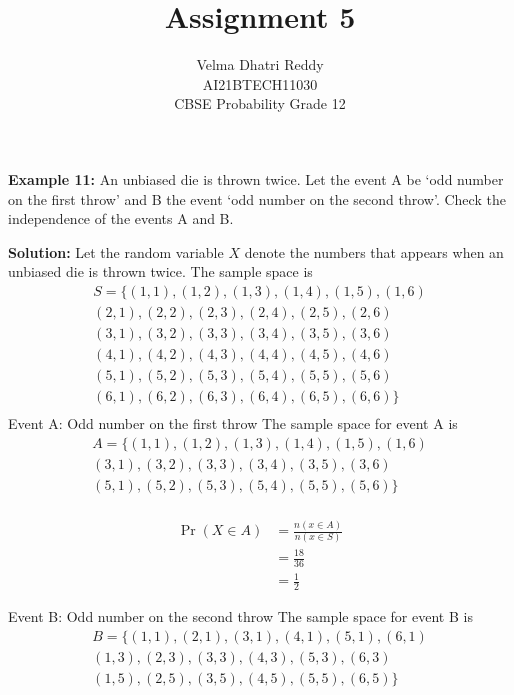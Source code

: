 \documentclass[journal,11pt,twocolumn]{IEEEtran}
\title{Assignment 5}
\author{Velma Dhatri Reddy \\ \normalsize AI21BTECH11030 \\ \vspace*{10pt} \Large CBSE Probability Grade 12}
\providecommand{\pr}[1]{\ensuremath{\Pr\left(#1\right)}}
\providecommand{\brak}[1]{\ensuremath{\left(#1\right)}}
\begin{document}
\maketitle
\textbf{Example 11:}
An unbiased die is thrown twice. Let the event A be ‘odd number on the first throw’ and B the event ‘odd number on the second throw’. Check the independence of the events A and B.

\textbf{Solution:} Let the random variable $X$ denote the numbers that appears when an unbiased die is thrown twice. The sample space is 
\begin{multline}
    S = \{\brak{1,1},\brak{1,2},\brak{1,3},\brak{1,4},\brak{1,5},\brak{1,6}\\
    \brak{2,1},\brak{2,2},\brak{2,3},\brak{2,4},\brak{2,5},\brak{2,6}\\
    \brak{3,1},\brak{3,2},\brak{3,3},\brak{3,4},\brak{3,5},\brak{3,6}\\
    \brak{4,1},\brak{4,2},\brak{4,3},\brak{4,4},\brak{4,5},\brak{4,6}\\
    \brak{5,1},\brak{5,2},\brak{5,3},\brak{5,4},\brak{5,5},\brak{5,6}\\
    \brak{6,1},\brak{6,2},\brak{6,3},\brak{6,4},\brak{6,5},\brak{6,6}\}\\
\end{multline}
Event A: Odd number on the first throw
The sample space for event A is 
\begin{multline}
    A = \{\brak{1,1},\brak{1,2},\brak{1,3},\brak{1,4},\brak{1,5},\brak{1,6}\\
    \brak{3,1},\brak{3,2},\brak{3,3},\brak{3,4},\brak{3,5},\brak{3,6}\\
    \brak{5,1},\brak{5,2},\brak{5,3},\brak{5,4},\brak{5,5},\brak{5,6}\}\\
\end{multline}

\begin{align}
    \pr{X \in A} &= \frac{n\brak{x \in A}}{n\brak{x \in S}}\\
    &= \frac{18}{36}\\
    &= \frac{1}{2}
\end{align}

Event B: Odd number on the second throw
The sample space for event B is
\begin{multline}
    B = \{\brak{1,1},\brak{2,1},\brak{3,1},\brak{4,1},\brak{5,1},\brak{6,1}\\
    \brak{1,3},\brak{2,3},\brak{3,3},\brak{4,3},\brak{5,3},\brak{6,3}\\
    \brak{1,5},\brak{2,5},\brak{3,5},\brak{4,5},\brak{5,5},\brak{6,5}\}\\
\end{multline}
\end{document}
